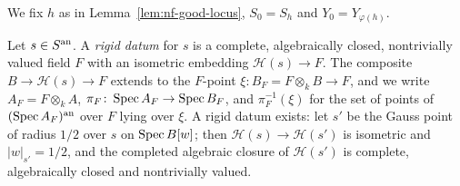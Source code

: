 We fix $h$ as in Lemma~\ref{lem:nf-good-locus}, $S_0=S_h$ and $Y_0=Y_{\varphi(h)}$.

\begin{definition}\label{def:nf-rigid-data}
\leanok
{}
Let $s\in S^{\mathrm{an}}$. A \emph{rigid datum} for $s$ is a complete, algebraically closed, nontrivially valued field $F$ with
an isometric embedding $\mathcal H(s)\to F$. The composite $B\to\mathcal H(s)\to F$ extends to the $F$-point
$\xi\colon B_F=F\otimes_kB\to F$, and we write $A_F=F\otimes_kA$, $\pi_F\colon\operatorname{Spec} A_F\to\operatorname{Spec} B_F$, and
$\pi_F^{-1}(\xi)$ for the set of points of $(\operatorname{Spec} A_F)^{\mathrm{an}}$ over $F$ lying over $\xi$. A rigid datum exists: let $s'$
be the Gauss point of radius $1/2$ over $s$ on $\operatorname{Spec} B[w]$; then $\mathcal H(s)\to\mathcal H(s')$ is isometric and
$|w|_{s'}=1/2$, and the completed algebraic closure of $\mathcal H(s')$ is complete, algebraically closed and
nontrivially valued.
\end{definition}

